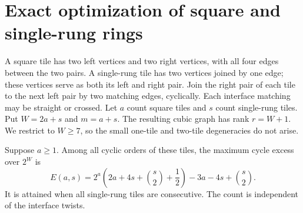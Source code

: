 \section{Exact optimization of square and single-rung rings}
\label{sec:four-coefficient-rings}

A square tile has two left vertices and two right vertices, with all four edges between the two pairs.
A single-rung tile has two vertices joined by one edge; these vertices serve as both its left and right pair.
Join the right pair of each tile to the next left pair by two matching edges, cyclically.
Each interface matching may be straight or crossed.
Let $a$ count square tiles and $s$ count single-rung tiles.
Put $W=2a+s$ and $m=a+s$.
The resulting cubic graph has rank $r=W+1$.
We restrict to $W\ge7$, so the small one-tile and two-tile degeneracies do not arise.

\begin{proposition}
\label{prop:four-coefficient-ring-order}
Suppose $a\ge1$.
Among all cyclic orders of these tiles, the maximum cycle excess over $2^W$ is
\[
 E(a,s)=2^a\left(2a+4s+\binom s2+\frac12\right)
        -3a-4s+\binom s2.
\]
It is attained when all single-rung tiles are consecutive.
The count is independent of the interface twists.
\end{proposition}

